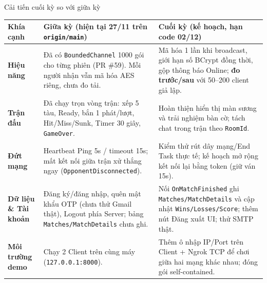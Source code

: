 \documentclass[aspectratio=169,9pt]{beamer}
\begin{document}
\begin{frame}[t,label=caitien]{Cải tiến cuối kỳ so với giữa kỳ}
  \footnotesize
  \begin{tabularx}{\textwidth}{@{}l Y Y@{}}
    \toprule
    \textbf{Khía cạnh} & \textbf{Giữa kỳ (hiện tại 27/11 trên \texttt{origin/main})} & \textbf{Cuối kỳ (kế hoạch, hạn code 02/12)} \\
    \midrule
    \textbf{Hiệu năng} &
      Đã có \texttt{BoundedChannel} 1000 gói cho từng phiên (PR \#59). Mỗi người nhận vẫn mã hóa AES riêng, chưa đo tải. &
      Mã hóa 1 lần khi broadcast, giới hạn số BCrypt đồng thời, gộp thông báo Online; \textbf{đo trước/sau} với 50--200 client giả lập. \\
    \textbf{Trận đấu} &
      Đã chạy trọn vòng trận: xếp 5 tàu, Ready, bắn 1 phát/lượt, Hit/Miss/Sunk, Timer 30 giây, \texttt{GameOver}. &
      Hoàn thiện hiển thị màn sương và trải nghiệm bàn cờ; tách chat trong trận theo \texttt{RoomId}. \\
    \textbf{Đứt mạng} &
      Heartbeat Ping 5s / timeout 15s; mất kết nối giữa trận xử thắng ngay (\texttt{OpponentDisconnected}). &
      Kiểm thử rút dây mạng/End Task thực tế; kế hoạch mở rộng kết nối lại bằng token (giữ ván 15s). \\
    \textbf{Dữ liệu \& Tài khoản} &
      Đăng ký/đăng nhập, quên mật khẩu OTP (chưa thử Gmail thật), Logout phía Server; bảng \texttt{Matches/MatchDetails} chưa ghi. &
      Nối \texttt{OnMatchFinished} ghi \texttt{Matches/MatchDetails} và cập nhật \texttt{Wins/Losses/Score}; thêm nút Đăng xuất UI; thử SMTP thật. \\
    \textbf{Môi trường demo} &
      Chạy 2 Client trên cùng máy (\texttt{127.0.0.1:8000}). &
      Thêm ô nhập IP/Port trên Client + Ngrok TCP để chơi giữa hai mạng khác nhau; đóng gói self-contained. \\
    \bottomrule
  \end{tabularx}
\end{frame}
\end{document}
